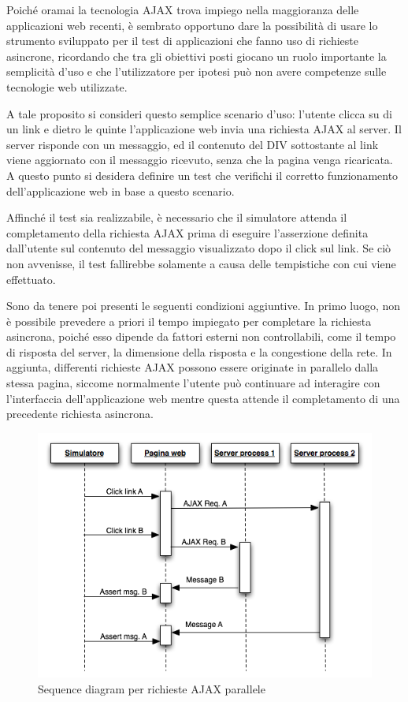 Poiché oramai la tecnologia AJAX trova impiego nella maggioranza delle applicazioni web recenti, è sembrato opportuno dare la possibilità di usare lo strumento sviluppato per il test di applicazioni che fanno uso di richieste asincrone, ricordando che tra gli obiettivi posti giocano un ruolo importante la semplicità d'uso e che l'utilizzatore per ipotesi può non avere competenze sulle tecnologie web utilizzate. 

A tale proposito si consideri questo semplice scenario d'uso: l'utente clicca su di un link e dietro le quinte l'applicazione web invia una richiesta AJAX al server. Il server risponde con un messaggio, ed il contenuto del DIV sottostante al link viene aggiornato con il messaggio ricevuto, senza che la pagina venga ricaricata. A questo punto si desidera definire un test che verifichi il corretto funzionamento dell'applicazione web in base a questo scenario. 

Affinché il test sia realizzabile, è necessario che il simulatore attenda il completamento della richiesta AJAX prima di eseguire l'asserzione definita dall'utente sul contenuto del messaggio visualizzato dopo il click sul link. Se ciò non avvenisse, il test fallirebbe solamente a causa delle tempistiche con cui viene effettuato.

Sono da tenere poi presenti le seguenti condizioni aggiuntive. In primo luogo, non è possibile prevedere a priori il tempo impiegato per completare la richiesta asincrona, poiché esso dipende da fattori esterni non controllabili, come il tempo di risposta del server, la dimensione della risposta e la congestione della rete. In aggiunta, differenti richieste AJAX possono essere originate in parallelo dalla stessa pagina, siccome normalmente l'utente può continuare ad interagire con l'interfaccia dell'applicazione web mentre questa attende il completamento di una precedente richiesta asincrona.

\begin{figure}[htbp]
\begin{center}
\includegraphics[width=\textwidth]{images/ajax_sync.png}
\caption{Sequence diagram per richieste AJAX parallele}
\label{fig:ajaxSequence}
\end{center}
\end{figure}

